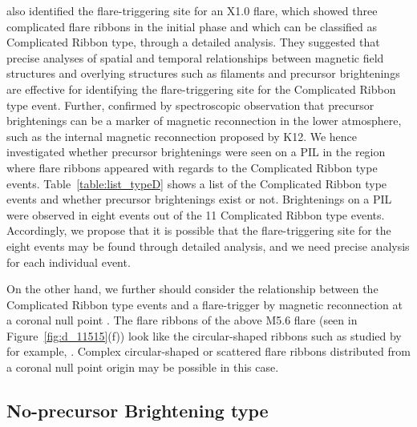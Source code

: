 \documentclass[10pt,preprint2]{aastex}
\begin{document}
\citet{bamba17a} also identified the flare-triggering site for an X1.0 flare, which showed three complicated flare ribbons in the initial phase and which can be classified as Complicated Ribbon type, through a detailed analysis.
They suggested that precise analyses of spatial and temporal relationships between magnetic field structures and overlying structures such as filaments and precursor brightenings are effective for identifying the flare-triggering site for the Complicated Ribbon type event.
Further, \citet{bamba17b} confirmed by spectroscopic observation that precursor brightenings can be a marker of magnetic reconnection in the lower atmosphere, such as the internal magnetic reconnection proposed by K12.
We hence investigated whether precursor brightenings were seen on a PIL in the region where flare ribbons appeared with regards to the Complicated Ribbon type events.
Table~\ref{table:list_typeD} shows a list of the Complicated Ribbon type events and whether precursor brightenings exist or not.
Brightenings on a PIL were observed in eight events out of the 11 Complicated Ribbon type events.
Accordingly, we propose that it is possible that the flare-triggering site for the eight events may be found through detailed analysis, and we need precise analysis for each individual event.

On the other hand, we further should consider the relationship between the Complicated Ribbon type events and a flare-trigger by magnetic reconnection at a coronal null point \citep{Longcope05, Titov07, Titov09}.
The flare ribbons of the above M5.6 flare (seen in Figure~\ref{fig:d_11515}(f)) look like the circular-shaped ribbons such as studied by for example, \citet{Masson09}.
Complex circular-shaped or scattered flare ribbons distributed from a coronal null point origin may be possible in this case.

\subsection{No-precursor Brightening type} \label{sec:dis_NB}
\end{document}
